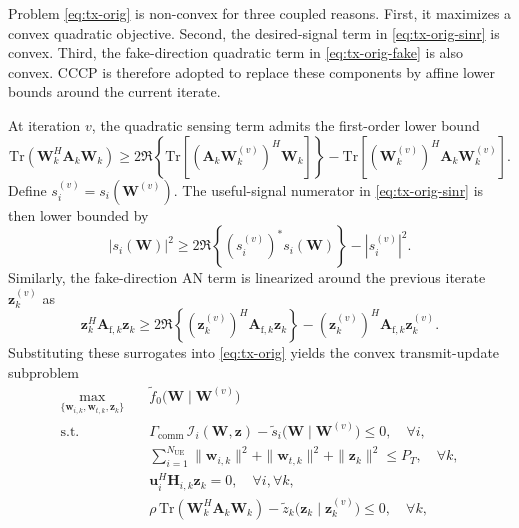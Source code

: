 \documentclass[conference,twocolumn,a4paper]{IEEEtran}
\begin{document}
Problem \eqref{eq:tx-orig} is non-convex for three coupled reasons. First, it maximizes a convex quadratic objective. Second, the desired-signal term in \eqref{eq:tx-orig-sinr} is convex. Third, the fake-direction quadratic term in \eqref{eq:tx-orig-fake} is also convex. CCCP is therefore adopted to replace these components by affine lower bounds around the current iterate.

At iteration $v$, the quadratic sensing term admits the first-order lower bound
\begin{equation}
\mathrm{Tr}(\mathbf{W}_k^H\mathbf{A}_k\mathbf{W}_k)
\ge 2\Re\!\left\{\mathrm{Tr}\!\left[(\mathbf{A}_k\mathbf{W}_k^{(v)})^H\mathbf{W}_k\right]\right\}
-\mathrm{Tr}\!\left[(\mathbf{W}_k^{(v)})^H\mathbf{A}_k\mathbf{W}_k^{(v)}\right].
\label{eq:obj-lb}
\end{equation}
Define $s_i^{(v)}=s_i(\mathbf{W}^{(v)})$. The useful-signal numerator in \eqref{eq:tx-orig-sinr} is then lower bounded by
\begin{equation}
|s_i(\mathbf{W})|^2\ge 2\Re\!\left\{\left(s_i^{(v)}\right)^*s_i(\mathbf{W})\right\}-|s_i^{(v)}|^2.
\label{eq:signal-lb}
\end{equation}
Similarly, the fake-direction AN term is linearized around the previous iterate $\mathbf{z}_k^{(v)}$ as
\begin{equation}
\mathbf{z}_k^H\mathbf{A}_{\mathrm{f},k}\mathbf{z}_k
\ge 2\Re\!\left\{(\mathbf{z}_k^{(v)})^H\mathbf{A}_{\mathrm{f},k}\mathbf{z}_k\right\}
-(\mathbf{z}_k^{(v)})^H\mathbf{A}_{\mathrm{f},k}\mathbf{z}_k^{(v)}.
\label{eq:fake-lb}
\end{equation}
Substituting these surrogates into \eqref{eq:tx-orig} yields the convex transmit-update subproblem
\begin{subequations}
\begin{align}
\max_{\{\mathbf{w}_{i,k},\mathbf{w}_{t,k},\mathbf{z}_k\}} \quad
& \widetilde f_0\big(\mathbf{W}\mid\mathbf{W}^{(v)}\big)
\label{eq:tx-cvx-obj}\\
\text{s.t.}\quad
& \Gamma_{\mathrm{comm}}\,\mathcal{I}_i(\mathbf{W},\mathbf{z})-\widetilde s_i\big(\mathbf{W}\mid\mathbf{W}^{(v)}\big)\le 0,\quad \forall i,
\label{eq:tx-cvx-sinr}\\
& \sum_{i=1}^{N_{\mathrm{UE}}}\|\mathbf{w}_{i,k}\|^2+\|\mathbf{w}_{t,k}\|^2+\|\mathbf{z}_k\|^2\le P_T,\quad \forall k,
\label{eq:tx-cvx-power}\\
& \mathbf{u}_i^H\mathbf{H}_{i,k}\mathbf{z}_k=0,\quad \forall i,\forall k,
\label{eq:tx-cvx-null}\\
& \rho\,\mathrm{Tr}(\mathbf{W}_k^H\mathbf{A}_k\mathbf{W}_k)-\widetilde z_k\big(\mathbf{z}_k\mid\mathbf{z}_k^{(v)}\big)\le 0,\quad \forall k,
\label{eq:tx-cvx-fake}
\end{align}
\label{eq:tx-cvx}
\end{subequations}
\end{document}
